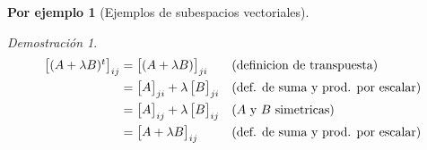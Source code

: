 \documentclass{article}
\theoremstyle{definition}
\theoremstyle{definition}
\newtheorem*{ej}{Por ejemplo}
\theoremstyle{remark}
\newtheorem*{demo}{Demostración}
\begin{document}
\begin{ej}[Ejemplos de subespacios vectoriales]
\begin{enumerate}[label=\arabic*. , start=4]
\begin{demo}
      \begin{align}
        \begin{bmatrix}(A+\lambda B)^t \end{bmatrix}_{ij}&= \begin{bmatrix}(A+\lambda B)\end{bmatrix}_{ji} && \text{(definicion de transpuesta)} \notag
                      \\                                 &= \begin{bmatrix}A\end{bmatrix}_{ji}+\lambda \begin{bmatrix}B\end{bmatrix}_{ji} &&\text{(def. de suma y prod. por escalar)} \notag \\
                                                         &=\begin{bmatrix}A\end{bmatrix}_{ij}+\lambda\begin{bmatrix}B\end{bmatrix}_{ij} &&\text{($A$ y $B$ simetricas)} \notag \\
                                                         &= \begin{bmatrix}A+\lambda B \end{bmatrix}_{ij} && \text{(def. de suma y prod. por escalar)} \notag
      \end{align}
    

\end{demo}
\end{enumerate}
\end{ej}
\end{document}
